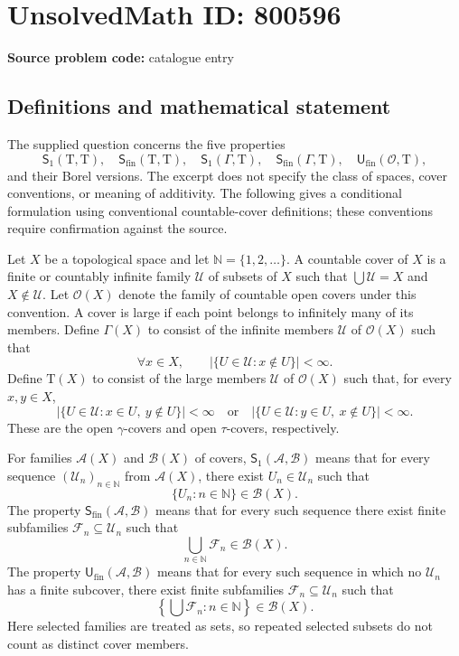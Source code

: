 \documentclass[11pt]{article}
\newcommand{\N}{\mathbb{N}}
\begin{document}
\section*{UnsolvedMath ID: 800596}
\textbf{Source problem code:} catalogue entry
\subsection{Definitions and mathematical statement}
The supplied question concerns the five properties
\[
\mathsf{S}_1(\mathrm{T},\mathrm{T}),\quad
\mathsf{S}_{\mathrm{fin}}(\mathrm{T},\mathrm{T}),\quad
\mathsf{S}_1(\Gamma,\mathrm{T}),\quad
\mathsf{S}_{\mathrm{fin}}(\Gamma,\mathrm{T}),\quad
\mathsf{U}_{\mathrm{fin}}(\mathcal{O},\mathrm{T}),
\]
and their Borel versions. The excerpt does not specify the class of spaces, cover conventions, or meaning of additivity. The following gives a conditional formulation using conventional countable-cover definitions; these conventions require confirmation against the source.

Let \(X\) be a topological space and let \(\N=\{1,2,\ldots\}\). A countable cover of \(X\) is a finite or countably infinite family \(\mathcal U\) of subsets of \(X\) such that \(\bigcup\mathcal U=X\) and \(X\notin\mathcal U\). Let \(\mathcal O(X)\) denote the family of countable open covers under this convention. A cover is large if each point belongs to infinitely many of its members. Define \(\Gamma(X)\) to consist of the infinite members \(\mathcal U\) of \(\mathcal O(X)\) such that
\[
\forall x\in X,\qquad
\bigl|\{U\in\mathcal U:x\notin U\}\bigr|<\infty.
\]
Define \(\mathrm T(X)\) to consist of the large members \(\mathcal U\) of \(\mathcal O(X)\) such that, for every \(x,y\in X\),
\[
\bigl|\{U\in\mathcal U:x\in U,\ y\notin U\}\bigr|<\infty
\quad\text{or}\quad
\bigl|\{U\in\mathcal U:y\in U,\ x\notin U\}\bigr|<\infty.
\]
These are the open \(\gamma\)-covers and open \(\tau\)-covers, respectively.

For families \(\mathscr A(X)\) and \(\mathscr B(X)\) of covers, \(\mathsf S_1(\mathscr A,\mathscr B)\) means that for every sequence \((\mathcal U_n)_{n\in\N}\) from \(\mathscr A(X)\), there exist \(U_n\in\mathcal U_n\) such that
\[
\{U_n:n\in\N\}\in\mathscr B(X).
\]
The property \(\mathsf S_{\mathrm{fin}}(\mathscr A,\mathscr B)\) means that for every such sequence there exist finite subfamilies \(\mathcal F_n\subseteq\mathcal U_n\) such that
\[
\bigcup_{n\in\N}\mathcal F_n\in\mathscr B(X).
\]
The property \(\mathsf U_{\mathrm{fin}}(\mathscr A,\mathscr B)\) means that for every such sequence in which no \(\mathcal U_n\) has a finite subcover, there exist finite subfamilies \(\mathcal F_n\subseteq\mathcal U_n\) such that
\[
\left\{\bigcup\mathcal F_n:n\in\N\right\}\in\mathscr B(X).
\]
Here selected families are treated as sets, so repeated selected subsets do not count as distinct cover members.
\end{document}
